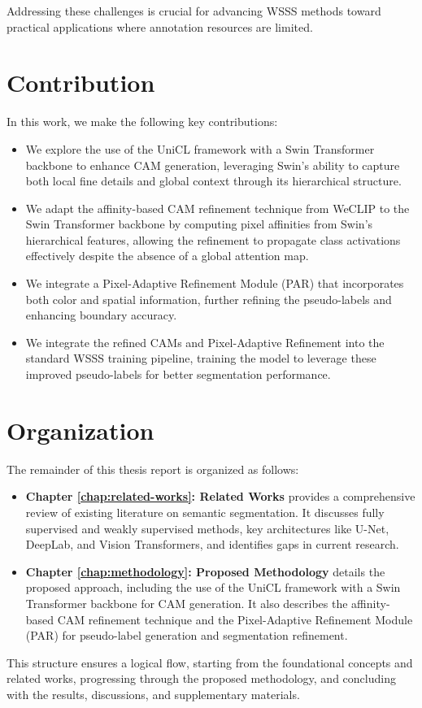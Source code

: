 Addressing these challenges is crucial for advancing WSSS methods toward practical applications where annotation resources are limited.


\section{Contribution}
\label{sec:contribution}

In this work, we make the following key contributions:

\begin{itemize}
    \item We explore the use of the UniCL framework \cite{vl_unicl} with a Swin Transformer backbone \cite{transformer_swin} to enhance CAM generation, leveraging Swin's ability to capture both local fine details and global context through its hierarchical structure.
    \item We adapt the affinity-based CAM refinement technique from WeCLIP \cite{wsss_frozen_clip} to the Swin Transformer backbone by computing pixel affinities from Swin's hierarchical features, allowing the refinement to propagate class activations effectively despite the absence of a global attention map.
    \item We integrate a Pixel-Adaptive Refinement Module (PAR) \cite{wsss_afa_affinity_from_attention} that incorporates both color and spatial information, further refining the pseudo-labels and enhancing boundary accuracy.
    \item We integrate the refined CAMs and Pixel-Adaptive Refinement into the standard WSSS training pipeline, training the model to leverage these improved pseudo-labels for better segmentation performance.

\end{itemize}

\section{Organization}
\label{sec:organization}

The remainder of this thesis report is organized as follows:

\begin{itemize}
    \item \textbf{Chapter \ref{chap:related-works}: Related Works} provides a comprehensive review of existing literature on semantic segmentation. It discusses fully supervised and weakly supervised methods, key architectures like U-Net, DeepLab, and Vision Transformers, and identifies gaps in current research.

    \item \textbf{Chapter \ref{chap:methodology}: Proposed Methodology} details the proposed approach, including the use of the UniCL framework with a Swin Transformer backbone for CAM generation. It also describes the affinity-based CAM refinement technique and the Pixel-Adaptive Refinement Module (PAR) for pseudo-label generation and segmentation refinement.
\end{itemize}

This structure ensures a logical flow, starting from the foundational concepts and related works, progressing through the proposed methodology, and concluding with the results, discussions, and supplementary materials.


